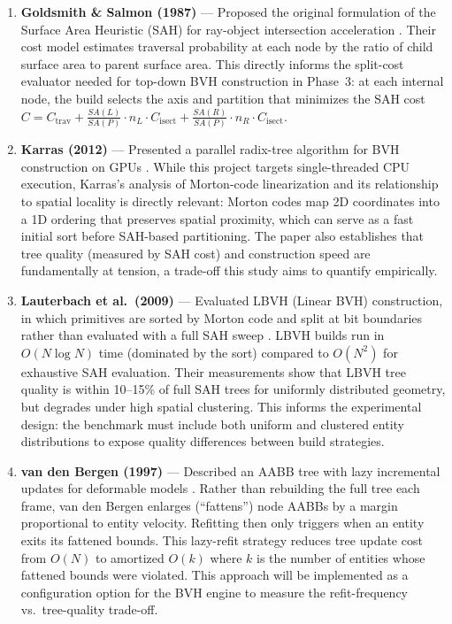 \documentclass[12pt]{article}
\begin{document}
\begin{enumerate}
    \item \textbf{Goldsmith \& Salmon (1987)} --- Proposed the original formulation of the Surface Area Heuristic (SAH) for ray-object intersection acceleration \cite{goldsmith1987}. Their cost model estimates traversal probability at each node by the ratio of child surface area to parent surface area. This directly informs the split-cost evaluator needed for top-down BVH construction in Phase~3: at each internal node, the build selects the axis and partition that minimizes the SAH cost $C = C_{\text{trav}} + \frac{SA(L)}{SA(P)} \cdot n_L \cdot C_{\text{isect}} + \frac{SA(R)}{SA(P)} \cdot n_R \cdot C_{\text{isect}}$.

    \item \textbf{Karras (2012)} --- Presented a parallel radix-tree algorithm for BVH construction on GPUs \cite{karras2012}. While this project targets single-threaded CPU execution, Karras's analysis of Morton-code linearization and its relationship to spatial locality is directly relevant: Morton codes map 2D coordinates into a 1D ordering that preserves spatial proximity, which can serve as a fast initial sort before SAH-based partitioning. The paper also establishes that tree quality (measured by SAH cost) and construction speed are fundamentally at tension, a trade-off this study aims to quantify empirically.

    \item \textbf{Lauterbach et al.\ (2009)} --- Evaluated LBVH (Linear BVH) construction, in which primitives are sorted by Morton code and split at bit boundaries rather than evaluated with a full SAH sweep \cite{lauterbach2009}. LBVH builds run in $O(N \log N)$ time (dominated by the sort) compared to $O(N^2)$ for exhaustive SAH evaluation. Their measurements show that LBVH tree quality is within 10--15\% of full SAH trees for uniformly distributed geometry, but degrades under high spatial clustering. This informs the experimental design: the benchmark must include both uniform and clustered entity distributions to expose quality differences between build strategies.

    \item \textbf{van den Bergen (1997)} --- Described an AABB tree with lazy incremental updates for deformable models \cite{vandenbergen1997}. Rather than rebuilding the full tree each frame, van den Bergen enlarges (``fattens'') node AABBs by a margin proportional to entity velocity. Refitting then only triggers when an entity exits its fattened bounds. This lazy-refit strategy reduces tree update cost from $O(N)$ to amortized $O(k)$ where $k$ is the number of entities whose fattened bounds were violated. This approach will be implemented as a configuration option for the BVH engine to measure the refit-frequency vs.\ tree-quality trade-off.
\end{enumerate}
\end{document}
